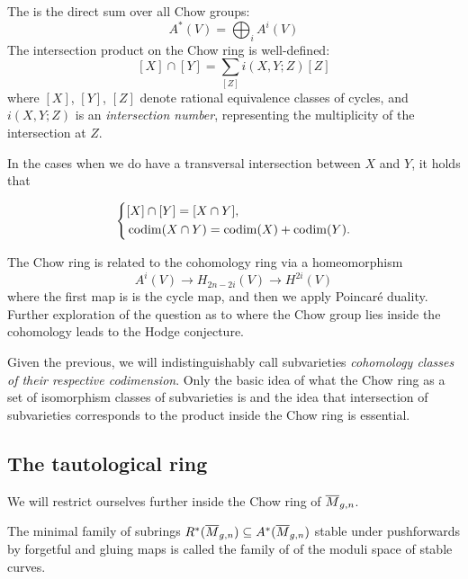 \documentclass[12pt]{memoir}
\begin{document}
The  is the direct sum over all Chow groups:
$$A^\ast(V) = \bigoplus_i A^i(V)$$
The intersection product on the Chow ring is well-defined:
$$[X] \cap [Y] = \sum_{[Z]} i(X, Y; Z) [Z]$$
where $[X]$, $[Y]$, $[Z]$ denote rational equivalence classes of cycles, and $i(X, Y; Z)$ is an \emph{intersection number}, representing the multiplicity of the intersection at $Z$.

\begin{Rmk}
In the cases when we do have a transversal intersection between $X$ and $Y$, it holds that 

$$
\left\lbrace
\begin{aligned}
&[X]\cap[Y]=[X\cap Y],\\
&\operatorname{codim}(X\cap Y)=\operatorname{codim}(X)+\operatorname{codim}(Y).
\end{aligned}
\right.
$$

\end{Rmk}

\begin{Rmk}
    The Chow ring is related to the cohomology ring via a homeomorphism 
    $$A^i(V)\to H_{2n-2i}(V)\to H^{2i}(V)$$
    where the first map is is the cycle map, and then we apply Poincaré duality. Further exploration of the question as to where the Chow group lies inside the cohomology leads to the Hodge conjecture.
\end{Rmk}

Given the previous, we will indistinguishably call subvarieties \emph{cohomology classes of their respective codimension}. Only the basic idea of what the Chow ring as a set of isomorphism classes of subvarieties is and the idea that intersection of subvarieties corresponds to the product inside the Chow ring is essential.

\subsection{The tautological ring}

We will restrict ourselves further inside the Chow ring of $\overline M_{g,n}$. 

\begin{Def}
The minimal family of subrings $R^\ast(\overline M_{g,n})\subseteq A^\ast(\overline M_{g,n})$ stable under pushforwards by forgetful and gluing maps is called the family of  of the moduli space of stable curves.
\end{Def}

\end{document}
